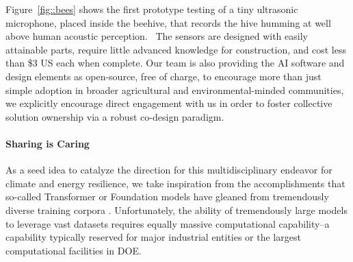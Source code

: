 Figure~\ref{fig::bees} shows the first prototype testing of a tiny ultrasonic microphone, placed inside the beehive, that records the hive humming at well above human acoustic perception.  
The sensors are designed with easily attainable parts, require little advanced knowledge for construction, and cost less than \$3 US each when complete. 
Our team is also providing the AI software and design elements as open-source, free of charge, to encourage more than just simple adoption in broader agricultural and environmental-minded communities, we explicitly encourage direct engagement with us in order to foster collective solution ownership via a robust co-design paradigm.




\paragraph{Sharing is Caring}
As a seed idea to catalyze the direction for this multidisciplinary endeavor for climate and energy resilience, we take inspiration from the accomplishments that so-called Transformer \cite{Attention2017} or Foundation \cite{StanfordFoundationPaper} models have gleaned from tremendously diverse training corpora \cite{bert,GPT2018}.
Unfortunately, the ability of tremendously large models to leverage vast datasets requires equally massive computational capability--a capability typically reserved for major industrial entities or the largest computational facilities in DOE. 

